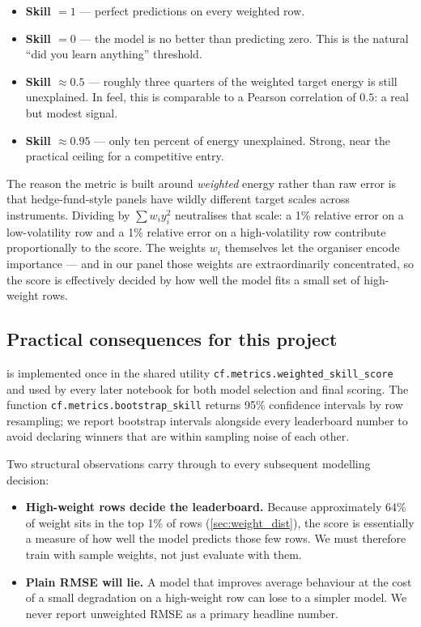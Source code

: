 \begin{itemize}
  \item \textbf{Skill $= 1$} --- perfect predictions on every weighted row.
  \item \textbf{Skill $= 0$} --- the model is no better than predicting zero. This is the natural ``did you learn anything'' threshold.
  \item \textbf{Skill $\approx 0.5$} --- roughly three quarters of the weighted target energy is still unexplained. In feel, this is comparable to a Pearson correlation of $0.5$: a real but modest signal.
  \item \textbf{Skill $\approx 0.95$} --- only ten percent of energy unexplained. Strong, near the practical ceiling for a competitive entry.
\end{itemize}

The reason the metric is built around \emph{weighted} energy rather than raw error is that hedge-fund-style panels have wildly different target scales across instruments. Dividing by $\sum w_i y_i^2$ neutralises that scale: a 1\% relative error on a low-volatility row and a 1\% relative error on a high-volatility row contribute proportionally to the score. The weights $w_i$ themselves let the organiser encode importance --- and in our panel those weights are extraordinarily concentrated, so the score is effectively decided by how well the model fits a small set of high-weight rows.

\subsection{Practical consequences for this project}

 is implemented once in the shared utility \texttt{cf.metrics.weighted\_skill\_score} and used by every later notebook for both model selection and final scoring. The function \texttt{cf.metrics.bootstrap\_skill} returns 95\% confidence intervals by row resampling; we report bootstrap intervals alongside every leaderboard number to avoid declaring winners that are within sampling noise of each other.

Two structural observations carry through to every subsequent modelling decision:

\begin{itemize}
  \item \textbf{High-weight rows decide the leaderboard.} Because approximately 64\% of weight sits in the top 1\% of rows (\cref{sec:weight_dist}), the score is essentially a measure of how well the model predicts those few rows. We must therefore train with sample weights, not just evaluate with them.
  \item \textbf{Plain RMSE will lie.} A model that improves average behaviour at the cost of a small degradation on a high-weight row can lose to a simpler model. We never report unweighted RMSE as a primary headline number.
\end{itemize}
